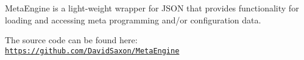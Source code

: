 Meta\-Engine is a light-\/weight wrapper for J\-S\-O\-N that provides functionality for loading and accessing meta programming and/or configuration data.

The source code can be found here\-: \href{https://github.com/DavidSaxon/MetaEngine}{\tt https\-://github.\-com/\-David\-Saxon/\-Meta\-Engine} 